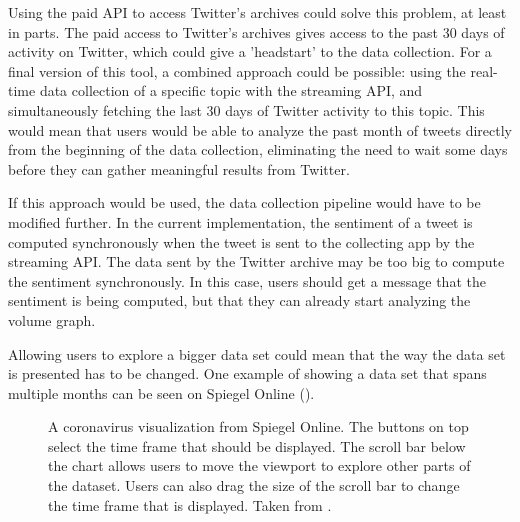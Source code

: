 Using the paid API to access Twitter's archives could solve this problem, at least in parts. The paid access to Twitter's archives gives access to the past 30 days of activity on Twitter, which could give a 'headstart' to the data collection. For a final version of this tool, a combined approach could be possible: using the real-time data collection of a specific topic with the streaming API, and simultaneously fetching the last 30 days of Twitter activity to this topic. This would mean that users would be able to analyze the past month of tweets directly from the beginning of the data collection, eliminating the need to wait some days before they can gather meaningful results from Twitter.

If this approach would be used, the data collection pipeline would have to be modified further. In the current implementation, the sentiment of a tweet is computed synchronously when the tweet is sent to the collecting app by the streaming API. The data sent by the Twitter archive may be too big to compute the sentiment synchronously. In this case, users should get a message that the sentiment is being computed, but that they can already start analyzing the volume graph.

Allowing users to explore a bigger data set could mean that the way the data set is presented has to be changed. One example of showing a data set that spans multiple months can be seen on Spiegel Online (\cite{merlotCoronavirusBrasilienManaus2020}).

\begin{figure}[htb!]
    \caption{A coronavirus visualization from Spiegel Online. The buttons on top select the time frame that should be displayed. The scroll bar below the chart allows users to move the viewport to explore other parts of the dataset. Users can also drag the size of the scroll bar to change the time frame that is displayed. Taken from \cite{merlotCoronavirusBrasilienManaus2020}.}
    \label{fig:spiegel_visualization}
\end{figure}

